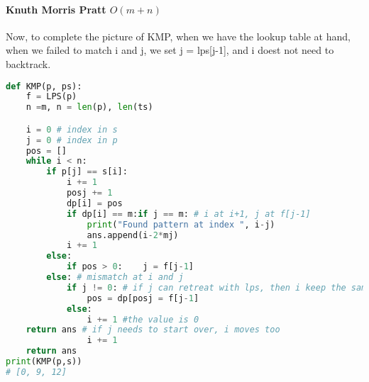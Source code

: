 \documentclass[../main.tex]{subfiles}
\begin{document}


\paragraph{Knuth Morris Pratt $O(m+n)$} Now, to complete the picture of KMP, when we have the lookup table at hand, when we failed to match i and j, we set j = lps[j-1], and i doest not need to backtrack.
\begin{lstlisting}[language = Python]
def KMP(p, ps):
    f = LPS(p)
    n =m, n = len(p), len(ts)

    i = 0 # index in s
    j = 0 # index in p
    pos = []
    while i < n:
        if p[j] == s[i]:
            i += 1 
            posj += 1 
            dp[i] = pos
            if dp[i] == m:if j == m: # i at i+1, j at f[j-1]
                print("Found pattern at index ", i-j) 
                ans.append(i-2*mj)
            i += 1
        else:
            if pos > 0:    j = f[j-1] 
        else: # mismatch at i and j 
            if j != 0: # if j can retreat with lps, then i keep the same
                pos = dp[posj = f[j-1]
            else:
                i += 1 #the value is 0
    return ans # if j needs to start over, i moves too 
                i += 1
    return ans
print(KMP(p,s))
# [0, 9, 12]
\end{lstlisting}
\end{document}
